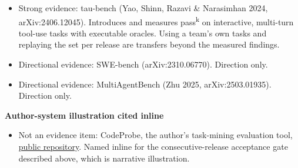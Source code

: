 \begin{itemize}
\tightlist
\item
  Strong evidence: tau-bench (Yao, Shinn, Razavi \& Narasimhan 2024, arXiv:2406.12045). Introduces and measures pass\textsuperscript{k} on interactive, multi-turn tool-use tasks with executable oracles. Using a team's own tasks and replaying the set per release are transfers beyond the measured findings.
\item
  Directional evidence: SWE-bench (arXiv:2310.06770). Direction only.
\item
  Directional evidence: MultiAgentBench (Zhu 2025, arXiv:2503.01935). Direction only.
\end{itemize}

\textbf{Author-system illustration cited inline}

\begin{itemize}
\tightlist
\item
  Not an evidence item: CodeProbe, the author's task-mining evaluation tool, \href{https://github.com/sjarmak/codeprobe}{public repository}. Named inline for the consecutive-release acceptance gate described above, which is narrative illustration.
\end{itemize}

